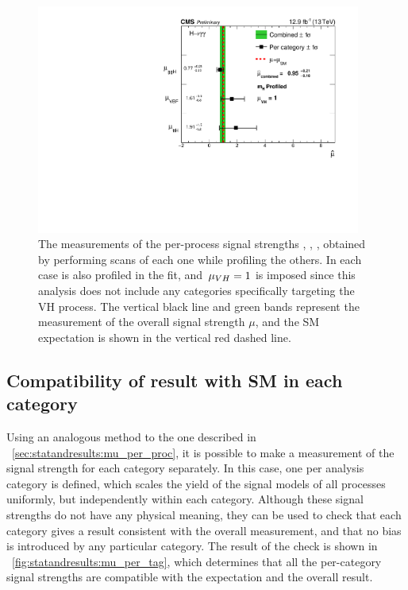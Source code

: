 \begin{figure}[ht!]
\centering
\includegraphics[width=0.95\textwidth]{statandresultsFigures/PerProcChannelCompatibilityProfileMH.pdf} 
\caption{The measurements of the per-process signal strengths \muggH, \muVBF, \muttH, obtained by performing \DNLL scans of each one while profiling the others. In each case \mH is also profiled in the fit, and $\,\mu_{VH}=1$ is imposed since this analysis does not include any categories specifically targeting the VH process. The vertical black line and green bands represent the measurement of the overall signal strength $\mu$, and the SM expectation is shown in the vertical red dashed line.}

\label{fig:statandresults:mu_per_proc}

\end{figure}

\subsection{Compatibility of result with SM in each category}

Using an analogous method to the one described in \Sec~\ref{sec:statandresults:mu_per_proc}, it is possible to make a measurement of the signal strength for each category separately. In this case, one \POI per analysis category is defined, which scales the yield of the signal models of all processes uniformly, but independently within each category. Although these signal strengths do not have any physical meaning, they can be used to check that each category gives a result consistent with the overall measurement, and that no bias is introduced by any particular category. The result of the check is shown in \Fig~\ref{fig:statandresults:mu_per_tag}, which determines that all the per-category signal strengths are compatible with the \SM expectation and the overall result.

